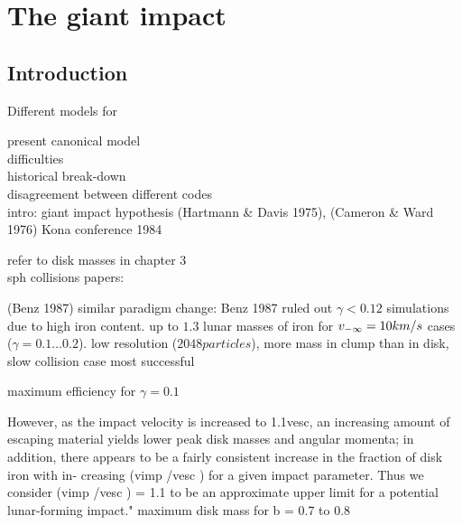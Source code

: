 \chapter{The giant impact}
\label{ch05}
\graphicspath{{./05figs/}}





\section{Introduction}
Different models for 

present canonical model\\
difficulties\\
historical break-down\\
disagreement between different codes\\


intro:
giant impact hypothesis \citep{1975Icar...24..504H} (Hartmann \& Davis 1975), \citep{1976LPI.....7..120C} (Cameron \& Ward 1976)
Kona conference 1984 \citep{1986ormo.conf.....H}

refer to disk masses in chapter 3\\

sph collisions papers:
\citep{Benz:1985p1755}


\citep{Benz:1989p1893}
(Benz 1987) \citep{1987Icar...71...30B} similar paradigm change: Benz 1987  ruled out $\gamma < 0.12$ simulations due to high iron content. up to $1.3$ lunar masses of iron for $v_{-\infty} = 10km/s$ cases ($\gamma = 0.1 \dots 0.2$). low resolution ($2048 particles$), more mass in clump than in disk, slow collision case most successful



\citep{Cameron:2000p1854}


\citep{Canup:2001p1861}
\citep{Canup:2001p3295}
maximum efficiency for $\gamma = 0.1$

\citep{Canup:2004p115}  However, as the impact velocity is increased to 1.1vesc, an increasing amount of escaping material yields lower peak disk masses and angular momenta; in addition, there appears to be a fairly consistent increase in the fraction of disk iron with in- creasing	(vimp /vesc ) for a given impact parameter. Thus we consider (vimp /vesc ) = 1.1 to be an approximate upper limit for a potential lunar-forming impact."
maximum disk mass for b = 0.7 to 0.8

